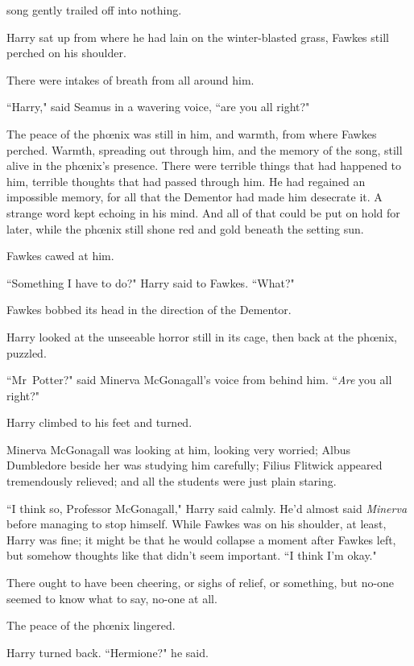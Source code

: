 
 song gently trailed off into nothing.

\hplettrineextrapara
Harry sat up from where he had lain on the winter-blasted grass, Fawkes still perched on his shoulder.

There were intakes of breath from all around him.

``Harry," said Seamus in a wavering voice, ``are you all right?"

The peace of the phœnix was still in him, and warmth, from where Fawkes perched. Warmth, spreading out through him, and the memory of the song, still alive in the phœnix's presence. There were terrible things that had happened to him, terrible thoughts that had passed through him. He had regained an impossible memory, for all that the Dementor had made him desecrate it. A strange word kept echoing in his mind. And all of that could be put on hold for later, while the phœnix still shone red and gold beneath the setting sun.

Fawkes cawed at him.

``Something I have to do?" Harry said to Fawkes. ``What?"

Fawkes bobbed its head in the direction of the Dementor.

Harry looked at the unseeable horror still in its cage, then back at the phœnix, puzzled.

``Mr~Potter?" said Minerva McGonagall's voice from behind him. ``\emph{Are} you all right?"

Harry climbed to his feet and turned.

Minerva McGonagall was looking at him, looking very worried; Albus Dumbledore beside her was studying him carefully; Filius Flitwick appeared tremendously relieved; and all the students were just plain staring.

``I think so, Professor McGonagall," Harry said calmly. He'd almost said \emph{Minerva} before managing to stop himself. While Fawkes was on his shoulder, at least, Harry was fine; it might be that he would collapse a moment after Fawkes left, but somehow thoughts like that didn't seem important. ``I think I'm okay."

There ought to have been cheering, or sighs of relief, or something, but no-one seemed to know what to say, no-one at all.

The peace of the phœnix lingered.

Harry turned back. ``Hermione?" he said.

